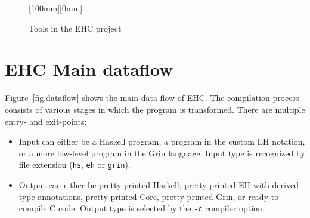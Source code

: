 \begin{figure}[tbp]
\raisebox{-10mm}[100mm][0mm]{}
\caption{Tools in the EHC project}
\label{fig.toolchain}
\end{figure}


\clearpage

\section{EHC Main dataflow}\label{sec.dataflow}

Figure~\ref{fig.dataflow} shows the main data flow of EHC.
The compilation process consists of various stages in which the
program is transformed. 
There are multiple entry- and exit-points:
\begin{itemize}
\item 
Input can either be a Haskell program, a program in the custom EH notation,
or a more low-level program in the Grin language.
Input type is recognized by file extension (\verb"hs", \verb"eh" or \verb"grin").
\item
Output can either be pretty printed Haskell, 
pretty printed EH with derived type annotations,
pretty printed Core,
pretty printed Grin,
or ready-to-compile C code.
Output type is selected by the \verb"-c" compiler option.
\end{itemize}

